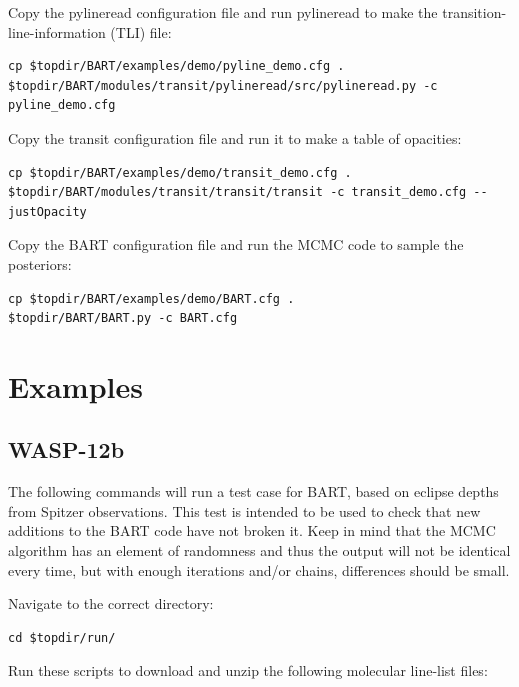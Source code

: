\documentclass[letterpaper, 12pt]{article}
\begin{document}
\noindent Copy the pylineread configuration file and run pylineread to
make the transition-line-information (TLI) file:

{\fontsize{9.8}{1em}\selectfont
\begin{verbatim}
cp $topdir/BART/examples/demo/pyline_demo.cfg .  
$topdir/BART/modules/transit/pylineread/src/pylineread.py -c pyline_demo.cfg
\end{verbatim}}

\noindent Copy the transit configuration file and run it to make a
table of opacities:

{\fontsize{9.8}{1em}\selectfont
\begin{verbatim}
cp $topdir/BART/examples/demo/transit_demo.cfg .
$topdir/BART/modules/transit/transit/transit -c transit_demo.cfg --justOpacity
\end{verbatim}}

\noindent Copy the BART configuration file and run the MCMC code to sample the
posteriors:

{\fontsize{9.8}{1em}\selectfont
\begin{verbatim}
cp $topdir/BART/examples/demo/BART.cfg .
$topdir/BART/BART.py -c BART.cfg
\end{verbatim}}

\section{Examples}
\subsection{WASP-12b}
The following commands will run a test case for BART, based on eclipse
depths from Spitzer observations. This test is intended to be used to
check that new additions to the BART code have not broken it. Keep in
mind that the MCMC algorithm has an element of randomness and thus the
output will not be identical every time, but with enough iterations
and/or chains, differences should be small.
\newline

\noindent Navigate to the correct directory:
{\fontsize{9.8}{1em}\selectfont
\begin{verbatim}
cd $topdir/run/
\end{verbatim}}

\noindent Run these scripts to download and unzip the following
molecular line-list files:
\end{document}
